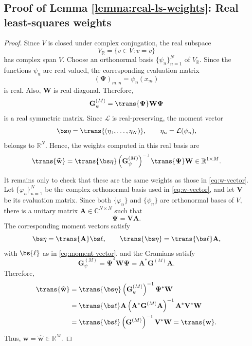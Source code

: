 \documentclass[10pt,dvipsnames]{amsart}
\begin{document}
\subsection{Proof of Lemma \ref{lemma:real-ls-weights}: Real least-squares weights}
\label{app:Real-ls-weights}
\realLeastSquaresWeights*
\begin{proof}
Since \(V\) is closed under complex conjugation, the real subspace
\[
    V_{\mathbb R}
    =
    \{v\in V: v=\overline v\}
\]
has complex span \(V\).  Choose an orthonormal basis
\(\{\psi_n\}_{n=1}^N\) of \(V_{\mathbb R}\).  Since the functions
\(\psi_n\) are real-valued, the corresponding evaluation matrix
\[
    (\mathbf \Psi)_{m,n}=\psi_n(x_m)
\]
is real.  Also, \(\mathbf W\) is real diagonal.  Therefore,
\[
    \mathbf G_\psi^{(M)}
    =
    \trans{\mathbf \Psi}\mathbf W\mathbf \Psi
\]
is a real symmetric matrix.  Since \(\mathcal L\) is real-preserving, the
moment vector
\[
    \bs\eta=\trans{(\eta_1,\ldots,\eta_N)},
    \qquad
    \eta_n=\mathcal L(\psi_n),
\]
belongs to \(\mathbb R^N\).  Hence, the weights computed in this real basis
are
\[
    \trans{\widehat{\mathbf w}}
    =
    \trans{\bs\eta}
    \left(\mathbf G_\psi^{(M)}\right)^{-1}
    \trans{\mathbf \Psi}\mathbf W
    \in \mathbb R^{1\times M}.
\]

It remains only to check that these are the same weights as those in
\eqref{eq:w-vector}.  Let \(\{\varphi_n\}_{n=1}^N\) be the complex
orthonormal basis used in \eqref{eq:w-vector}, and let \(\mathbf V\) be its
evaluation matrix.  Since both \(\{\varphi_n\}\) and \(\{\psi_n\}\) are
orthonormal bases of \(V\), there is a unitary matrix
\(\mathbf A\in\mathbb C^{N\times N}\) such that
\[
    \mathbf \Psi=\mathbf V\mathbf A .
\]
The corresponding moment vectors satisfy
\[
    \bs\eta=\trans{\mathbf A}\bs\ell,
    \qquad
    \trans{\bs\eta}=\trans{\bs\ell}\mathbf A,
\]
with $\bs{\ell}$ as in \eqref{eq:moment-vector}, and the Gramians satisfy
\[
    \mathbf G_\psi^{(M)}
    =
    \mathbf \Psi^*\mathbf W\mathbf \Psi
    =
    \mathbf A^*\mathbf G^{(M)}\mathbf A .
\]
Therefore,
\[
\begin{aligned}
    \trans{\widehat{\mathbf w}}
    &=
    \trans{\bs\eta}
    \left(\mathbf G_\psi^{(M)}\right)^{-1}
    \mathbf \Psi^*\mathbf W  \\
    &=
    \trans{\bs\ell}\mathbf A
    \left(\mathbf A^*\mathbf G^{(M)}\mathbf A\right)^{-1}
    \mathbf A^*\mathbf V^*\mathbf W  \\
    &=
    \trans{\bs\ell}
    \left(\mathbf G^{(M)}\right)^{-1}
    \mathbf V^*\mathbf W
    =
    \trans{\mathbf w} .
\end{aligned}
\]
Thus, \(\mathbf w=\widehat{\mathbf w}\in\mathbb R^M\).
\end{proof}
\end{document}
